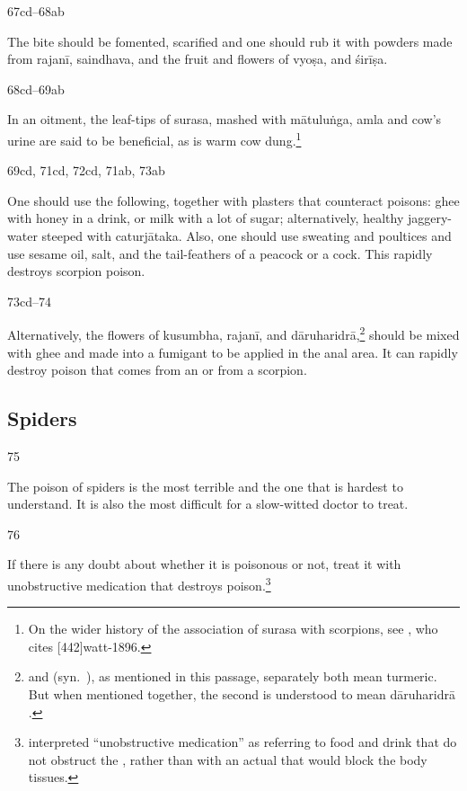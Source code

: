 \begin{translation}
\item[67cd--68ab]

The bite should be fomented, scarified and one should rub it with
powders made from  \gls{rajanī}, \gls{saindhava}, and the fruit and
flowers of \gls{vyoṣa}, and \gls{śirīṣa}.

\item[68cd--69ab]

In an oitment, the leaf-tips of \gls{surasa}, mashed with
\gls{mātuluṅga}, \gls{amla} and cow's urine are said to be beneficial,
as is warm cow dung.\footnote{On the wider history of the
    association of \gls{surasa} with scorpions, see \citet[40 et
    passim]{simo-1998}, who cites [442]{watt-1896}.} 

\item[69cd, 71cd, 72cd, 71ab, 73ab]

One should use the following, together with plasters that counteract poisons:
ghee with honey in a drink, or milk with a lot of sugar; alternatively, healthy 
jaggery-water steeped with \gls{caturjātaka}. Also, one should use sweating 
and poultices and use sesame oil, salt, and the tail-feathers of a peacock or a 
cock. This  rapidly destroys scorpion poison.

\item[73cd--74]

Alternatively, the flowers of \gls{kusumbha}, \gls{rajanī}, and
\gls{dāruharidrā},\footnote{ and  (syn.\
    ), as mentioned in this passage, separately both mean
    turmeric.  But when mentioned together, the second is understood to
    mean \gls{dāruharidrā} \citep[227]{gvdb}.} should be mixed with ghee
    and made into a fumigant to be applied in the anal area.  It can
    rapidly destroy poison that comes from an \se{kīṭa}{insect} or from a
    scorpion.



 
 \subsection{Spiders}
 
 \item[75]
 
 The poison of spiders is the most terrible and the one that is
hardest to understand.  It is also the most difficult for a
slow-witted doctor to treat.

\item[76]

If there is any doubt about whether it is poisonous or not, treat it
with unobstructive medication that destroys
poison.\footnote{ interpreted “unobstructive
    medication” as referring to food and drink that do not obstruct the
    \sepl{dhātu}{body tissue}, rather than with an actual
     that would block the body tissues.}


\end{translation}
